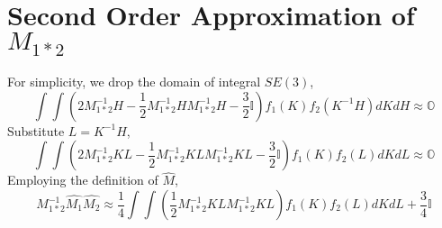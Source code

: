 \documentclass[twocolumn,10pt]{asme2ej}
\newcommand{\II}{\mathbb{I}}
\begin{document}
\section{Second Order Approximation of $M_{1*2}$}
For simplicity, we drop the domain of integral $SE(3)$,
\begin{equation}
\int\int\left(2M_{1*2}^{-1}H - \dfrac{1}{2}M_{1*2}^{-1}HM_{1*2}^{-1}H - \dfrac{3}{2}\II \right)f_{1}(K)f_{2}(K^{-1}H)dKdH \approx \mathbb{O}
\end{equation}
Substitute $L = K^{-1}H$,
\begin{equation}
\int\int \left(2M_{1*2}^{-1}KL - \dfrac{1}{2}M_{1*2}^{-1}KLM_{1*2}^{-1}KL - \dfrac{3}{2}\II \right)f_{1}(K)f_{2}(L)dKdL \approx \mathbb{O}
\end{equation}
Employing the definition of $\widehat{M}$,
\begin{equation}
M_{1*2}^{-1}\widehat{M_{1}}\widehat{M_{2}} \approx \dfrac{1}{4} \int\int \left(\dfrac{1}{2}M_{1*2}^{-1}KLM_{1*2}^{-1}KL \right)f_{1}(K)f_{2}(L)dKdL + \dfrac{3}{4}\II 
\end{equation}






















\end{document}
